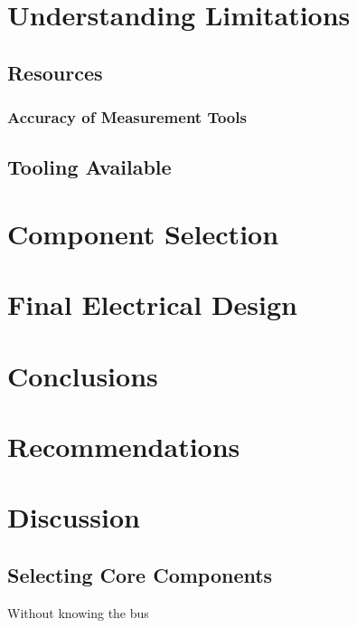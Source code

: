 \documentclass[12pt]{article}
\begin{document}
	\section{Understanding Limitations}
	\subsection{Resources}
  \subsubsection{Accuracy of Measurement Tools}
	\subsection{Tooling Available}
	
	\section{Component Selection}
	
	\section{Final Electrical Design}

  \section{Conclusions}

  \section{Recommendations}

  \section{Discussion}

  \subsection{Selecting Core Components\label{sec:select-core-comp}}

  Without knowing the bus 
	
	
    \printglossaries
    
    \printbibliography[heading=bibintoc]
	
\end{document}
